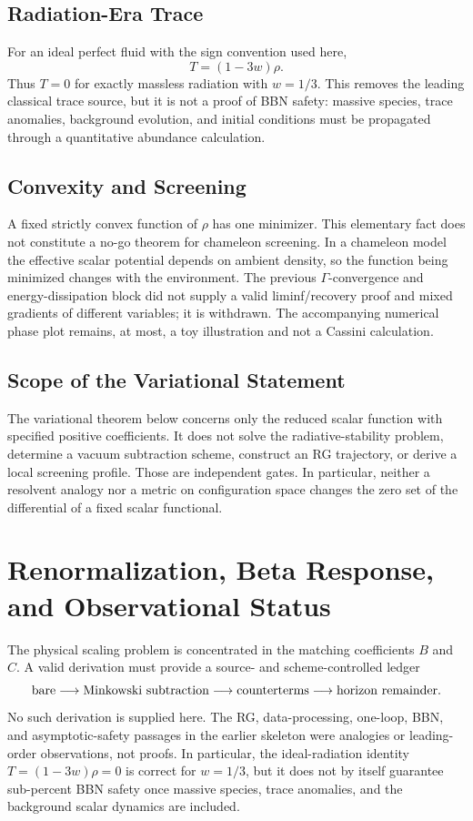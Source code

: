 \documentclass[12pt,a4paper]{article}
\theoremstyle{definition}
\theoremstyle{plain}
\theoremstyle{remark}
\begin{document}
\subsection{Radiation-Era Trace}\label{sec:BBN}

For an ideal perfect fluid with the sign convention used here,
\[
 T=(1-3w)\rho .
\]
Thus \(T=0\) for exactly massless radiation with \(w=1/3\).  This removes the
leading classical trace source, but it is not a proof of BBN safety: massive
species, trace anomalies, background evolution, and initial conditions must
be propagated through a quantitative abundance calculation.

\subsection{Convexity and Screening}\label{sec:screening-gamma}

A fixed strictly convex function of \(\rho\) has one minimizer.  This elementary
fact does not constitute a no-go theorem for chameleon screening.  In a
chameleon model the effective scalar potential depends on ambient density, so
the function being minimized changes with the environment.  The previous
\(\Gamma\)-convergence and energy-dissipation block did not supply a valid
liminf/recovery proof and mixed gradients of different variables; it is
withdrawn.  The accompanying numerical phase plot remains, at most, a toy
illustration and not a Cassini calculation.

\subsection{Scope of the Variational Statement}\label{sec:resolvent-vacuum}

The variational theorem below concerns only the reduced scalar function with
specified positive coefficients.  It does not solve the radiative-stability
problem, determine a vacuum subtraction scheme, construct an RG trajectory,
or derive a local screening profile.  Those are independent gates.  In
particular, neither a resolvent analogy nor a metric on configuration space
changes the zero set of the differential of a fixed scalar functional.

\section{Renormalization, Beta Response, and Observational Status}
\label{sec:renorm}

The physical scaling problem is concentrated in the matching coefficients
\(B\) and \(C\).  A valid derivation must provide a source- and
scheme-controlled ledger
\[
 {\rm bare}\longrightarrow{\rm Minkowski\ subtraction}
 \longrightarrow{\rm counterterms}
 \longrightarrow{\rm horizon\ remainder}.
\]
No such derivation is supplied here.  The RG, data-processing, one-loop, BBN,
and asymptotic-safety passages in the earlier skeleton were analogies or
leading-order observations, not proofs.  In particular, the ideal-radiation
identity \(T=(1-3w)\rho=0\) is correct for \(w=1/3\), but it does not by itself
guarantee sub-percent BBN safety once massive species, trace anomalies, and
the background scalar dynamics are included.
\end{document}

